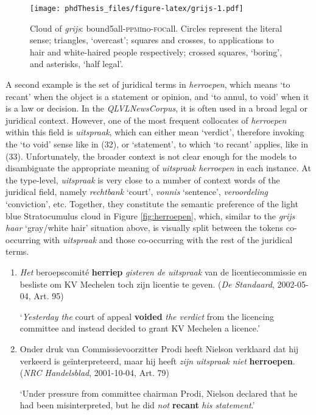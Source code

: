 \documentclass[
]{book}
\begin{document}
\begin{figure}
\centering
\texttt{[image: phdThesis\_files/figure-latex/grijs-1.pdf]}
\caption{\label{fig:grijs}Cloud of \emph{grijs}: bound5all-\textsc{ppmi}no-\textsc{foc}all. Circles represent the literal sense; triangles, `overcast'; squares and crosses, to applications to hair and white-haired people respectively; crossed squares, `boring', and asterisks, `half legal'.}
\end{figure}

A second example is the set of juridical terms in \emph{herroepen}, which means `to recant' when the object is a statement or opinion, and `to annul, to void' when it is a law or decision. In the \emph{QLVLNewsCorpus}, it is often used in a broad legal or juridical context. However, one of the most frequent collocates of \emph{herroepen} within this field is \emph{uitspraak}, which can either mean `verdict', therefore invoking the `to void' sense like in (32), or `statement', to which `to recant' applies, like in (33). Unfortunately, the broader context is not clear enough for the models to disambiguate the appropriate meaning of \emph{uitspraak herroepen} in each instance. At the type-level, \emph{uitspraak} is very close to a number of context words of the juridical field, namely \emph{rechtbank} `court', \emph{vonnis} `sentence', \emph{veroordeling} `conviction', etc. Together, they constitute the semantic preference of the light blue Stratocumulus cloud in Figure \ref{fig:herroepen}, which, similar to the \emph{grijs haar} `gray/white hair' situation above, is visually split between the tokens co-occurring with \emph{uitspraak} and those co-occurring with the rest of the juridical terms.

\begin{enumerate}
\def\labelenumi{(\arabic{enumi})}
\setcounter{enumi}{31}
\item
  \emph{Het} beroepscomité \textbf{herriep} \emph{gisteren} \emph{de} \emph{uitspraak} van de licentiecommissie en besliste om KV Mechelen toch zijn licentie te geven. (\emph{De Standaard}, 2002-05-04, Art. 95)

  `\emph{Yesterday the} court of appeal \textbf{voided} \emph{the verdict} from the licencing committee and instead decided to grant KV Mechelen a licence.'
\item
  Onder druk van Commissievoorzitter Prodi heeft Nielson verklaard dat hij verkeerd is geïnterpreteerd, maar hij heeft \emph{zijn} \emph{uitspraak} \emph{niet} \textbf{herroepen}. (\emph{NRC Handelsblad}, 2001-10-04, Art. 79)

  `Under pressure from committee chairman Prodi, Nielson declared that he had been misinterpreted, but he did \emph{not} \textbf{recant} \emph{his statement}.'
\end{enumerate}
\end{document}
